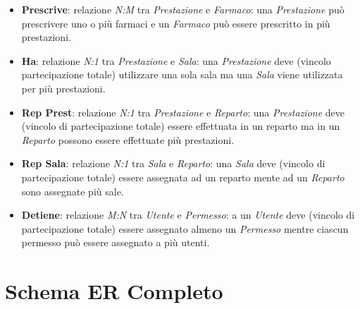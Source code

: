 \documentclass[paper=a4, fontsize=11pt,x11names]{report}
\begin{document}
\begin{itemize}
\item \textbf{Prescrive}: relazione \textit{N:M} tra \textit{Prestazione} e \textit{Farmaco}: una \textit{Prestazione} può prescrivere uno o più farmaci e un \textit{Farmaco} può essere prescritto in più prestazioni.
\item \textbf{Ha}: relazione \textit{N:1} tra \textit{Prestazione} e \textit{Sala}: una \textit{Prestazione} deve (vincolo partecipazione totale) utilizzare una sola sala ma una \textit{Sala} viene utilizzata per più prestazioni.
\item \textbf{Rep Prest}: relazione \textit{N:1} tra \textit{Prestazione} e \textit{Reparto}: una \textit{Prestazione} deve (vincolo di partecipazione totale) essere effettuata in un reparto ma in un \textit{Reparto} possono essere effettuate più prestazioni.
\item \textbf{Rep Sala}: relazione \textit{N:1} tra \textit{Sala} e \textit{Reparto}: una \textit{Sala} deve (vincolo di partecipazione totale) essere assegnata ad un reparto mente ad un \textit{Reparto} sono assegnate più sale. 
\item \textbf{Detiene}: relazione \textit{M:N} tra \textit{Utente} e \textit{Permesso}: a un \textit{Utente} deve (vincolo di partecipazione totale) essere assegnato almeno un \textit{Permesso} mentre ciascun permesso può essere assegnato a più utenti. 
\end{itemize}


\section{Schema ER Completo}
\end{document}
